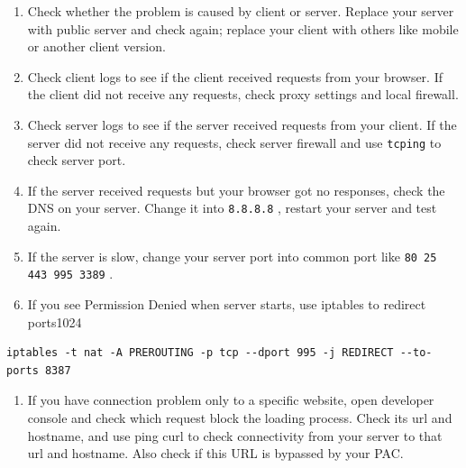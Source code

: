 \documentclass[11pt,a4paper]{sphinxmanual}
\begin{document}
\begin{enumerate}
\item Check whether the problem is caused by client or server. Replace your server with public server and check again; replace your client with others like mobile or another client version.
\item Check client logs to see if the client received requests from your browser. If the client did not receive any requests, check proxy settings and local firewall.
\item Check server logs to see if the server received requests from your client. If the server did not receive any requests, check server firewall and use \verb~tcping~ to check server port.
\item If the server received requests but your browser got no responses, check the DNS on your server. Change it into \verb~8.8.8.8~ , restart your server and test again.
\item If the server is slow, change your server port into common port like \verb~80 25 443 995 3389~ .
\item If you see Permission Denied when server starts, use iptables to redirect ports1024
\end{enumerate}
\begin{Verbatim}
iptables -t nat -A PREROUTING -p tcp --dport 995 -j REDIRECT --to-ports 8387
\end{Verbatim}

\begin{enumerate}
\item If you have connection problem only to a specific website, open developer console and check which request block the loading process. Check its url and hostname, and use ping curl to check connectivity from your server to that url and hostname. Also check if this URL is bypassed by your PAC.
\end{enumerate}
\end{document}
